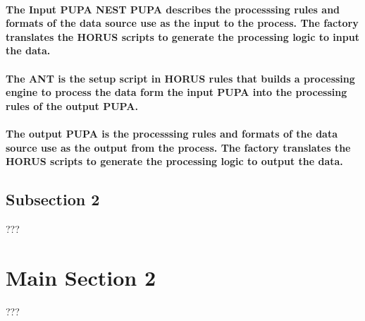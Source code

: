 \paragraph{The Input PUPA NEST PUPA describes the processsing rules and formats of the data source use as the input to the process. The factory translates the HORUS scripts to generate the processing logic to input the data.}
\paragraph{The ANT is the setup script in HORUS rules that builds a processing engine to process the data form the input PUPA into the processing rules of the output PUPA. }
\paragraph{The output PUPA is the processsing rules and formats of the data source use as the output from the process. The factory translates the HORUS scripts to generate the processing logic to output the data.}


\subsection{Subsection 2}

???


\section{Main Section 2}

???
